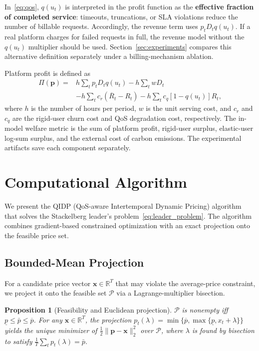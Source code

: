 \documentclass[11pt]{article}
\newtheorem{proposition}{Proposition}
\newcommand{\qos}{q}
\newcommand{\pcap}{\bar p}
\newcommand{\R}{R}
\newcommand{\D}{D}
\begin{document}
In~\eqref{eq:qos}, $\qos(u_t)$ is interpreted in the profit function as the
\textbf{effective fraction of completed service}: timeouts, truncations, or
SLA violations reduce the number of billable requests. Accordingly, the
revenue term uses $p_t\D_t\qos(u_t)$. If a real platform charges for failed
requests in full, the revenue model without the $\qos(u_t)$ multiplier
should be used. Section~\ref{sec:experiments} compares this alternative
definition separately under a billing-mechanism ablation.

Platform profit is defined as
\begin{align}
  \Pi(\boldsymbol{p})={}&
  h\sum_t p_t\D_t\qos(u_t)
  -h\sum_t w\D_t \nonumber\\
  &-h\sum_t c_r(\overline{\R}_t-\R_t)
  -h\sum_t c_q[1-\qos(u_t)]\R_t,
  \label{eq:profit}
\end{align}
where $h$ is the number of hours per period, $w$ is the unit serving cost,
and $c_r$ and $c_q$ are the rigid-user churn cost and QoS degradation cost,
respectively. The in-model welfare metric is the sum of platform profit,
rigid-user surplus, elastic-user log-sum surplus, and the external cost of
carbon emissions. The experimental artifacts save each component separately.

\section{Computational Algorithm}
\label{sec:algorithm}

We present the QIDP (QoS-aware Intertemporal Dynamic Pricing) algorithm
that solves the Stackelberg leader's problem~\eqref{eq:leader_problem}.
The algorithm combines gradient-based constrained optimization with an exact
projection onto the feasible price set.

\subsection{Bounded-Mean Projection}

For a candidate price vector $\boldsymbol{x}\in\mathbb{R}^T$ that may violate
the average-price constraint, we project it onto the feasible set $\mathcal{P}$
via a Lagrange-multiplier bisection.

\begin{proposition}[Feasibility and Euclidean projection]
  \label{prop:projection}
  $\mathcal{P}$ is nonempty iff $\underline p\leq\pcap\leq\overline p$. For
  any $\boldsymbol{x}\in\mathbb{R}^T$, the projection
  $p_t(\lambda)=\min\{\overline p,\max\{\underline p,x_t+\lambda\}\}$
  yields the unique minimizer of $\frac12\|\boldsymbol{p}-\boldsymbol{x}\|_2^2$
  over $\mathcal{P}$, where $\lambda$ is found by bisection to satisfy
  $\frac1T\sum_t p_t(\lambda)=\pcap$.
  \label{eq:projection}
\end{proposition}
\end{document}
